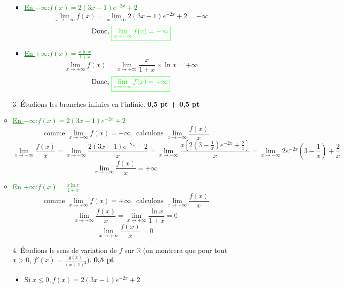 \documentclass[12pt]{article}
\begin{document}
\begin{itemize}
\begin{itemize}
        \begin{itemize}
        \item \textcolor{green}{\underline{En $-\infty$}:$f(x)=2(3x - 1)e^{-2x} + 2$}
        \[\lim_{x \to -\infty}f(x)=\lim_{x \to -\infty}2(3x - 1)e^{-2x} + 2=-\infty\]
        \[\text{Donc, }\color{green}{\boxed{\lim_{x \to -\infty}f(x)=-\infty}}\]
         \item \textcolor{green}{\underline{En $+\infty$}:$f(x)=\frac{x\ln x}{1+x}$}
        \[\lim_{x \to +\infty}f(x)=\lim_{x \to +\infty}\frac{x}{1+x}\times \ln x=+\infty\]
        \[\text{Donc, }\color{green}{\boxed{\lim_{x \to +\infty}f(x)=+\infty}}\]
        \textcolor{green}{}
        \end{itemize}
        \item[3.] Étudions les branches infinies en l'infinie. \textbf{0,5 pt + 0,5 pt}
        \item \textcolor{green}{\underline{En $-\infty$}:$f(x)=2(3x - 1)e^{-2x} + 2$}
        \[\text{ comme }\lim_{x \to -\infty}f(x)=-\infty, \text{ calculons } \lim_{x \to -\infty}\frac{f(x)}{x}\]
         \[\lim_{x \to -\infty}\frac{f(x)}{x}=\lim_{x \to -\infty}\frac{2(3x - 1)e^{-2x} + 2}{x}=\lim_{x \to -\infty}\frac{x\left[ 2\left( 3 - \frac{1}{x}\right)e^{-2x} + \frac{2}{x}\right] }{x}=\lim_{x \to -\infty}2e^{-2x}\left( 3 - \frac{1}{x}\right) + \frac{2}{x}\]
         \[\lim_{x \to -\infty}\frac{f(x)}{x}=+\infty\]
         \textcolor{green}{}
         \item \textcolor{green}{\underline{En $+\infty$}:$f(x)=\frac{x\ln x}{1+x}$}
               \[\text{ comme }\lim_{x \to +\infty}f(x)=+\infty, \text{ calculons } \lim_{x \to +\infty}\frac{f(x)}{x}\]
               \[\lim_{x \to +\infty}\frac{f(x)}{x}=\lim_{x \to +\infty}\frac{\ln x}{1+x}=0\]
                \[\lim_{x \to +\infty}\frac{f(x)}{x}=0\]
          \textcolor{green}{}
        \item[4.] Étudions le sens de variation de $f$ sur $\mathbb{R}$ (on montrera que pour tout $x > 0$, $f'(x) = \frac{g(x)}{(x + 1)^{2}}$). \textbf{0,5 pt}
        \begin{itemize}
        	\item Si $x \leq 0, f(x)=2(3x - 1)e^{-2x} + 2$
        	

\end{itemize}
\end{itemize}
\end{itemize}
\end{document}

